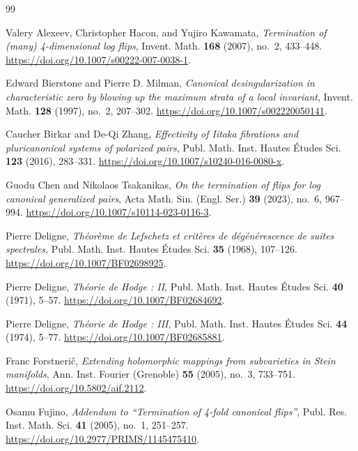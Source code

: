 \documentclass[11pt]{amsart}
\theoremstyle{definition}
\theoremstyle{remark}
\numberwithin{equation}{section}
\begin{document}
\begin{thebibliography}{99}
\raggedright

Valery Alexeev, Christopher Hacon, and Yujiro Kawamata,
\emph{Termination of (many) 4-dimensional log flips},
Invent. Math. \textbf{168} (2007), no.~2, 433--448.
\url{https://doi.org/10.1007/s00222-007-0038-1}.

Edward Bierstone and Pierre D. Milman,
\emph{Canonical desingularization in characteristic zero by blowing up the
maximum strata of a local invariant},
Invent. Math. \textbf{128} (1997), no.~2, 207--302.
\url{https://doi.org/10.1007/s002220050141}.

Caucher Birkar and De-Qi Zhang,
\emph{Effectivity of Iitaka fibrations and pluricanonical systems of polarized pairs},
Publ. Math. Inst. Hautes \'{E}tudes Sci. \textbf{123} (2016), 283--331.
\url{https://doi.org/10.1007/s10240-016-0080-x}.

Guodu Chen and Nikolaos Tsakanikas,
\emph{On the termination of flips for log canonical generalized pairs},
Acta Math. Sin. (Engl. Ser.) \textbf{39} (2023), no.~6, 967--994.
\url{https://doi.org/10.1007/s10114-023-0116-3}.

Pierre Deligne,
\emph{Th\'eor\`eme de Lefschetz et crit\`eres de d\'eg\'en\'erescence de suites spectrales},
Publ. Math. Inst. Hautes \'{E}tudes Sci. \textbf{35} (1968), 107--126.
\url{https://doi.org/10.1007/BF02698925}.

Pierre Deligne,
\emph{Th\'eorie de Hodge : II},
Publ. Math. Inst. Hautes \'{E}tudes Sci. \textbf{40} (1971), 5--57.
\url{https://doi.org/10.1007/BF02684692}.

Pierre Deligne,
\emph{Th\'eorie de Hodge : III},
Publ. Math. Inst. Hautes \'{E}tudes Sci. \textbf{44} (1974), 5--77.
\url{https://doi.org/10.1007/BF02685881}.

Franc Forstneri\v{c},
\emph{Extending holomorphic mappings from subvarieties in Stein manifolds},
Ann. Inst. Fourier (Grenoble) \textbf{55} (2005), no.~3, 733--751.
\url{https://doi.org/10.5802/aif.2112}.

Osamu Fujino,
\emph{Addendum to \textquotedblleft Termination of 4-fold canonical flips\textquotedblright},
Publ. Res. Inst. Math. Sci. \textbf{41} (2005), no.~1, 251--257.
\url{https://doi.org/10.2977/PRIMS/1145475410}.


\end{thebibliography}
\end{document}
